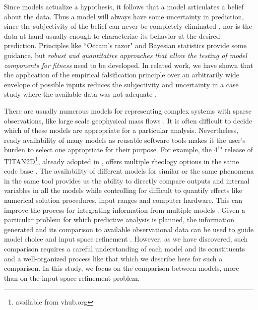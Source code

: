 \documentclass{article}
\begin{document}
Since models actualize a hypothesis, it follows  that a model articulates a belief about the data. Thus a model will always have some uncertainty in prediction, since the {subjectivity of the belief} can never be completely eliminated \citep{Kennedy2001, Higdon2004}, nor is  the data at hand  usually enough to characterize its behavior at the desired prediction. Principles like ``Occam's razor" and Bayesian statistics \citep{Farrell2015} provide some guidance, but {\it  robust and quantitative approaches that allow the  testing of model components for fitness }need to be developed. In related work, we have shown that the  application of the empirical falsification principle \citep{Popper1959} over an arbitrarily wide envelope of possible inputs reduces the subjectivity and uncertainty in a case study where the available data was not adequate \citep{Bevilacqua2019}.

There are usually numerous models for representing complex systems with sparse observations, like large scale geophysical mass flows \cite{Kelfoun2011}. It is often difficult to decide which of these models are appropriate for a particular analysis. Nevertheless, ready availability of many models as reusable software tools makes it the user's burden to select one appropriate for their purpose.
For example, the $\mathrm{4^{\mathrm{th}}}$ release of TITAN2D\footnote{available from vhub.org}, already adopted in \citep{Bevilacqua2019}, offers multiple rheology options in the same code base \citep{Simakov2019}. The availability of different models for similar or the same phenomena in the same tool provides us the ability to directly compare outputs and internal variables in all the models while controlling for difficult to quantify effects like numerical solution procedures, input ranges and computer hardware. This can improve the process for integrating information from multiple models \citep{Bongard2007}. Given a particular problem for which predictive analysis is planned, the information generated and its comparison to available observational data can be used to guide model choice and input space refinement \citep{Bevilacqua2019}. However, as we have discovered, such comparison requires a careful understanding of each model and its constituents and a well-organized process like that which we describe here for such a comparison. In this study, we focus on the comparison between models, more than on the input space refinement problem. %
\end{document}
